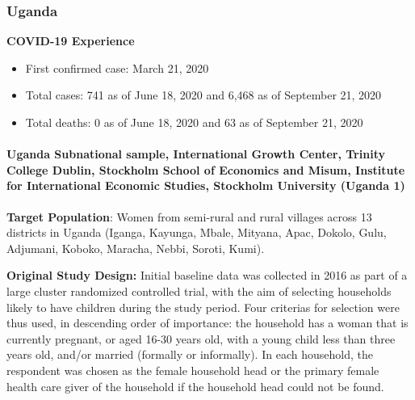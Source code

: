 \documentclass[
  12pt,
]{article}
\begin{document}
\hypertarget{uganda}{%
\subsubsection*{Uganda}\label{uganda}}

\textbf{COVID-19 Experience}

\begin{itemize}
        \item First confirmed case: March 21, 2020
        \item Total cases:  741 as of June 18, 2020 and 6,468 as of September 21, 2020         \item Total deaths:  0 as of June 18, 2020 and 63 as of September 21, 2020 
\end{itemize}

\hypertarget{uganda-subnational-sample-international-growth-center-trinity-college-dublin-stockholm-school-of-economics-and-misum-institute-for-international-economic-studies-stockholm-university-uganda-1}{%
\paragraph*{Uganda Subnational sample, International Growth Center, Trinity College Dublin, Stockholm School of Economics and Misum, Institute for International Economic Studies, Stockholm University (Uganda 1)}\label{uganda-subnational-sample-international-growth-center-trinity-college-dublin-stockholm-school-of-economics-and-misum-institute-for-international-economic-studies-stockholm-university-uganda-1}}

\textbf{Target Population}: Women from semi-rural and rural villages across 13 districts in Uganda (Iganga, Kayunga, Mbale, Mityana, Apac, Dokolo, Gulu, Adjumani, Koboko, Maracha, Nebbi, Soroti, Kumi).

\textbf{Original Study Design:} Initial baseline data was collected in 2016 as part of a large cluster randomized controlled trial, with the aim of selecting households likely to have children during the study period. Four criterias for selection were thus used, in descending order of importance: the household has a woman that is currently pregnant, or aged 16-30 years old, with a young child less than three years old, and/or married (formally or informally). In each household, the respondent was chosen as the female household head or the primary female health care giver of the household if the household head could not be found.
\end{document}
